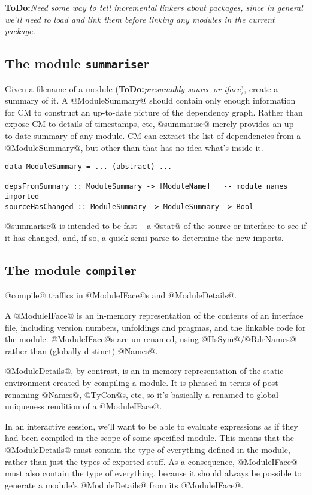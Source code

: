 \documentclass[11pt]{article}
\newcommand{\ToDo}[1]{{{\bf ToDo:}\sl #1}}
\begin{document}
\ToDo{Need some way to tell incremental linkers about packages,
      since in general we'll need to load and link them before
      linking any modules in the current package.}


\subsection{The module \mbox{\tt summarise}r}
Given a filename of a module (\ToDo{presumably source or iface}),
create a summary of it.  A @ModuleSummary@ should contain only enough
information for CM to construct an up-to-date picture of the
dependency graph.  Rather than expose CM to details of timestamps,
etc, @summarise@ merely provides an up-to-date summary of any module.
CM can extract the list of dependencies from a @ModuleSummary@, but
other than that has no idea what's inside it.
\begin{verbatim}
data ModuleSummary = ... (abstract) ...

depsFromSummary :: ModuleSummary -> [ModuleName]   -- module names imported
sourceHasChanged :: ModuleSummary -> ModuleSummary -> Bool
\end{verbatim}
@summarise@ is intended to be fast -- a @stat@ of the source or
interface to see if it has changed, and, if so, a quick semi-parse to
determine the new imports.

\subsection{The module \mbox{\tt compile}r}
@compile@ traffics in @ModuleIFace@s and @ModuleDetails@.  

A @ModuleIFace@ is an in-memory representation of the contents of an
interface file, including version numbers, unfoldings and pragmas, and
the linkable code for the module.  @ModuleIFace@s are un-renamed,
using @HsSym@/@RdrNames@ rather than (globally distinct) @Names@.

@ModuleDetails@, by contrast, is an in-memory representation of the
static environment created by compiling a module.  It is phrased in
terms of post-renaming @Names@, @TyCon@s, etc, so it's basically a
renamed-to-global-uniqueness rendition of a @ModuleIFace@.

In an interactive session, we'll want to be able to evaluate
expressions as if they had been compiled in the scope of some
specified module.  This means that the @ModuleDetails@ must contain
the type of everything defined in the module, rather than just the
types of exported stuff.  As a consequence, @ModuleIFace@ must also
contain the type of everything, because it should always be possible
to generate a module's @ModuleDetails@ from its @ModuleIFace@.
\end{document}
